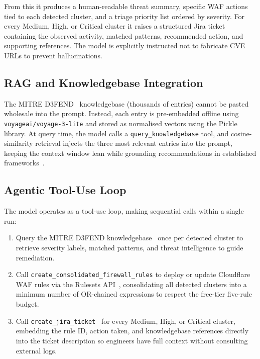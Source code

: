 \documentclass[12pt, a4paper]{report}   %
\begin{document}
From this it produces a human-readable threat summary, specific WAF actions tied to
each detected cluster, and a triage priority list ordered by severity. For every
Medium, High, or Critical cluster it raises a structured Jira ticket~\cite{jira-api} 
containing the observed activity, matched patterns, recommended action, and supporting 
references. The model is explicitly instructed not to fabricate CVE URLs to prevent
hallucinations.

\subsection{RAG and Knowledgebase Integration}

The MITRE D3FEND~\cite{d3fend} knowledgebase (thousands of entries) cannot be
pasted wholesale into the prompt. Instead, each entry is pre-embedded offline using
\texttt{voyageai/voyage-3-lite} and stored as normalised vectors using the Pickle library. At query time, the 
model calls a \texttt{query\_knowledgebase} tool, and cosine-similarity retrieval 
injects the three most relevant entries into the prompt, keeping the context window 
lean while grounding recommendations in established 
frameworks~\cite{d3fend,mitre-recon}.

\subsection{Agentic Tool-Use Loop}

The model operates as a tool-use loop, making sequential calls within a single run:

\begin{enumerate}
  \item Query the MITRE D3FEND knowledgebase~\cite{d3fend} once per detected cluster 
        to retrieve severity labels, matched patterns, and threat intelligence to 
        guide remediation.
  \item Call \texttt{create\_consolidated\_firewall\_rules} to deploy or update
        Cloudflare WAF rules via the Rulesets API~\cite{cf-api-lockdown}, 
        consolidating all detected clusters into a minimum number of OR-chained 
        expressions to respect the free-tier five-rule budget.
  \item Call \texttt{create\_jira\_ticket}~\cite{jira-api} for every Medium, High, 
        or Critical cluster, embedding the rule ID, action taken, and knowledgebase 
        references directly into the ticket description so engineers have full context 
        without consulting external logs.
\end{enumerate}
\end{document}
